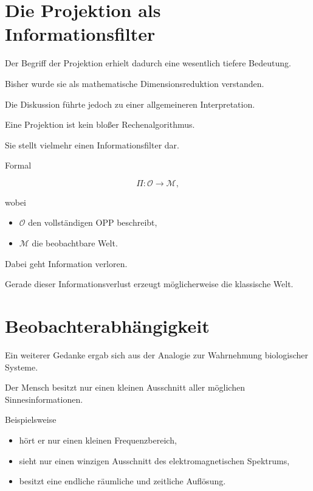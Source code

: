 \section*{Die Projektion als Informationsfilter}

Der Begriff der Projektion erhielt dadurch eine wesentlich tiefere Bedeutung.

Bisher wurde sie als mathematische Dimensionsreduktion verstanden.

Die Diskussion führte jedoch zu einer allgemeineren Interpretation.

Eine Projektion ist kein bloßer Rechenalgorithmus.

Sie stellt vielmehr einen Informationsfilter dar.

Formal

\[
\Pi :
\mathcal{O}
\rightarrow
\mathcal{M},
\]

wobei

\begin{itemize}

\item
\(
\mathcal{O}
\)
den vollständigen OPP beschreibt,

\item
\(
\mathcal{M}
\)
die beobachtbare Welt.

\end{itemize}

Dabei geht Information verloren.

Gerade dieser Informationsverlust erzeugt möglicherweise die klassische Welt.

\section*{Beobachterabhängigkeit}

Ein weiterer Gedanke ergab sich aus der Analogie zur Wahrnehmung biologischer Systeme.

Der Mensch besitzt nur einen kleinen Ausschnitt aller möglichen Sinnesinformationen.

Beispielsweise

\begin{itemize}

\item hört er nur einen kleinen Frequenzbereich,

\item sieht nur einen winzigen Ausschnitt des elektromagnetischen Spektrums,

\item besitzt eine endliche räumliche und zeitliche Auflösung.

\end{itemize}

